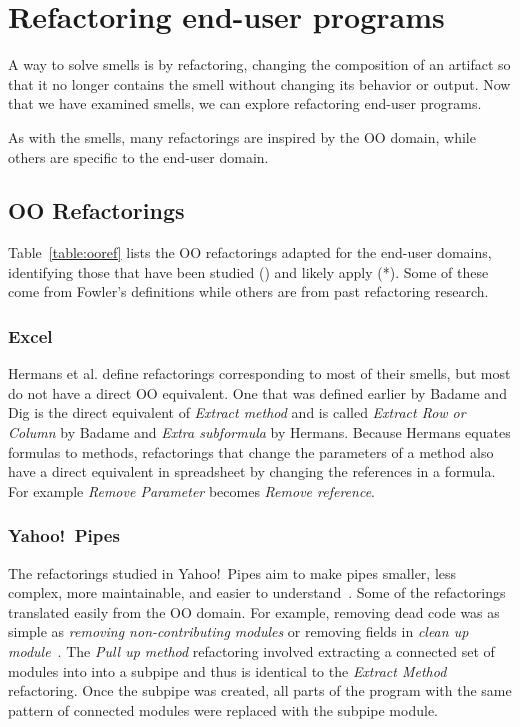 \documentclass[10pt,conference,compsocconf]{IEEEtran}
\begin{document}
\section{Refactoring end-user programs}
\label{sec:refactoring}

A way to solve smells is by refactoring, changing the composition of an artifact so that it no longer contains the smell without changing its behavior or output.
Now that we have examined smells, we can explore refactoring end-user programs.

As with the smells, many refactorings are inspired by the OO domain, while others are specific to the end-user domain. 

\subsection{OO Refactorings}
Table~\ref{table:ooref} lists the OO refactorings adapted for the end-user domains, identifying those that have been studied () and likely apply (*).
Some of these come from Fowler's definitions while others are from past refactoring research. 

\subsubsection{Excel}

Hermans et al. \cite{Hermans2012intraExt} define refactorings corresponding to most of their smells, but most do not have a direct OO equivalent.
One that was defined earlier by Badame and Dig \cite{badame2012refactoring} is the direct equivalent of \emph{Extract method} and is called \emph{Extract Row or Column} by Badame and \emph{Extra subformula} by Hermans.
Because Hermans equates formulas to methods, refactorings that change the parameters of a method also have a direct equivalent in spreadsheet by changing the references in a formula. For example \emph{Remove Parameter} becomes \emph{Remove reference}.
 
\subsubsection{Yahoo!\ Pipes}
The refactorings studied in Yahoo!\ Pipes aim to make pipes smaller, less complex, more maintainable, and easier to understand~\cite{StoleeTSE2013}.
Some of the refactorings translated easily from the OO domain. For example, removing dead code was as simple as \emph{removing non-contributing modules} or removing fields in \emph{clean up module}~\cite{StoleeTSE2013}.
The \emph{Pull up method} refactoring involved extracting a connected set of modules into into a subpipe and thus is identical to the \emph{Extract Method} refactoring.
Once the subpipe was created, all  parts of the program with the same pattern of connected modules were replaced with the subpipe module. 
\end{document}
